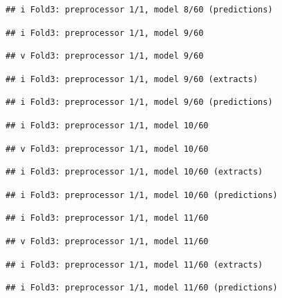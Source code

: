 \documentclass[
]{article}
\begin{document}
\begin{verbatim}
## i Fold3: preprocessor 1/1, model 8/60 (predictions)
\end{verbatim}

\begin{verbatim}
## i Fold3: preprocessor 1/1, model 9/60
\end{verbatim}

\begin{verbatim}
## v Fold3: preprocessor 1/1, model 9/60
\end{verbatim}

\begin{verbatim}
## i Fold3: preprocessor 1/1, model 9/60 (extracts)
\end{verbatim}

\begin{verbatim}
## i Fold3: preprocessor 1/1, model 9/60 (predictions)
\end{verbatim}

\begin{verbatim}
## i Fold3: preprocessor 1/1, model 10/60
\end{verbatim}

\begin{verbatim}
## v Fold3: preprocessor 1/1, model 10/60
\end{verbatim}

\begin{verbatim}
## i Fold3: preprocessor 1/1, model 10/60 (extracts)
\end{verbatim}

\begin{verbatim}
## i Fold3: preprocessor 1/1, model 10/60 (predictions)
\end{verbatim}

\begin{verbatim}
## i Fold3: preprocessor 1/1, model 11/60
\end{verbatim}

\begin{verbatim}
## v Fold3: preprocessor 1/1, model 11/60
\end{verbatim}

\begin{verbatim}
## i Fold3: preprocessor 1/1, model 11/60 (extracts)
\end{verbatim}

\begin{verbatim}
## i Fold3: preprocessor 1/1, model 11/60 (predictions)
\end{verbatim}
\end{document}
